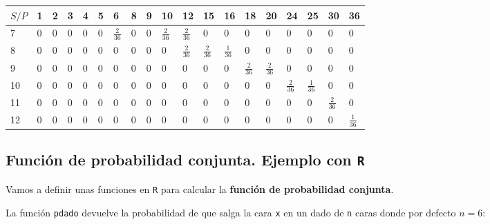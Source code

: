 \documentclass[]{book}
\newenvironment{Shaded}{\begin{snugshade}}{\end{snugshade}}
\newcommand{\ControlFlowTok}[1]{\textcolor[rgb]{0.13,0.29,0.53}{\textbf{#1}}}
\newcommand{\DataTypeTok}[1]{\textcolor[rgb]{0.13,0.29,0.53}{#1}}
\newcommand{\DecValTok}[1]{\textcolor[rgb]{0.00,0.00,0.81}{#1}}
\newcommand{\KeywordTok}[1]{\textcolor[rgb]{0.13,0.29,0.53}{\textbf{#1}}}
\newcommand{\NormalTok}[1]{#1}
\newcommand{\OperatorTok}[1]{\textcolor[rgb]{0.81,0.36,0.00}{\textbf{#1}}}
\newcommand{\StringTok}[1]{\textcolor[rgb]{0.31,0.60,0.02}{#1}}
\begin{document}
\begin{longtable}[]{@{}lllllllllllllllllll@{}}
\toprule
\(S/P\) & 1 & 2 & 3 & 4 & 5 & 6 & 8 & 9 & 10 & 12 & 15 & 16 & 18 & 20 & 24 & 25 & 30 & 36\tabularnewline
\midrule
\endhead
7 & 0 & 0 & 0 & 0 & 0 & \(\frac{2}{36}\) & 0 & 0 & \(\frac{2}{36}\) & \(\frac{2}{36}\) & 0 & 0 & 0 & 0 & 0 & 0 & 0 & 0\tabularnewline
8 & 0 & 0 & 0 & 0 & 0 & 0 & 0 & 0 & 0 & \(\frac{2}{36}\) & \(\frac{2}{36}\) & \(\frac{1}{36}\) & 0 & 0 & 0 & 0 & 0 & 0\tabularnewline
9 & 0 & 0 & 0 & 0 & 0 & 0 & 0 & 0 & 0 & 0 & 0 & 0 & \(\frac{2}{36}\) & \(\frac{2}{36}\) & 0 & 0 & 0 & 0\tabularnewline
10 & 0 & 0 & 0 & 0 & 0 & 0 & 0 & 0 & 0 & 0 & 0 & 0 & 0 & 0 & \(\frac{2}{36}\) & \(\frac{1}{36}\) & 0 & 0\tabularnewline
11 & 0 & 0 & 0 & 0 & 0 & 0 & 0 & 0 & 0 & 0 & 0 & 0 & 0 & 0 & 0 & 0 & \(\frac{2}{36}\) & 0\tabularnewline
12 & 0 & 0 & 0 & 0 & 0 & 0 & 0 & 0 & 0 & 0 & 0 & 0 & 0 & 0 & 0 & 0 & 0 & \(\frac{1}{36}\)\tabularnewline
\bottomrule
\end{longtable}

\hypertarget{funciuxf3n-de-probabilidad-conjunta.-ejemplo-con-r}{%
\subsection{\texorpdfstring{Función de probabilidad conjunta. Ejemplo con \texttt{R}}{Función de probabilidad conjunta. Ejemplo con R}}\label{funciuxf3n-de-probabilidad-conjunta.-ejemplo-con-r}}

Vamos a definir unas funciones en \texttt{R} para calcular la \textbf{función de probabilidad conjunta}.

La función \texttt{pdado} devuelve la probabilidad de que salga la cara \texttt{x} en un dado de \texttt{n} caras donde por defecto \(n=6\):

\begin{Shaded}
\end{Shaded}
\end{document}
